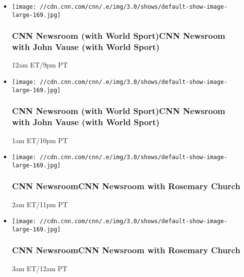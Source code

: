 \begin{itemize}
\item
  \texttt{[image: //cdn.cnn.com/cnn/.e/img/3.0/shows/default-show-image-large-169.jpg]}

  \hypertarget{cnn-newsroom-with-world-sportcnn-newsroom-with-john-vause-with-world-sport--4}{%
  \subsubsection{CNN Newsroom (with World Sport)CNN Newsroom with John
  Vause (with World Sport)
  }\label{cnn-newsroom-with-world-sportcnn-newsroom-with-john-vause-with-world-sport--4}}

  12am ET/9pm PT
\end{itemize}

\begin{itemize}
\item
  \texttt{[image: //cdn.cnn.com/cnn/.e/img/3.0/shows/default-show-image-large-169.jpg]}

  \hypertarget{cnn-newsroom-with-world-sportcnn-newsroom-with-john-vause-with-world-sport--5}{%
  \subsubsection{CNN Newsroom (with World Sport)CNN Newsroom with John
  Vause (with World Sport)
  }\label{cnn-newsroom-with-world-sportcnn-newsroom-with-john-vause-with-world-sport--5}}

  1am ET/10pm PT
\end{itemize}

\begin{itemize}
\item
  \texttt{[image: //cdn.cnn.com/cnn/.e/img/3.0/shows/default-show-image-large-169.jpg]}

  \hypertarget{cnn-newsroomcnn-newsroom-with-rosemary-church--6}{%
  \subsubsection{CNN NewsroomCNN Newsroom with Rosemary Church
  }\label{cnn-newsroomcnn-newsroom-with-rosemary-church--6}}

  2am ET/11pm PT
\end{itemize}

\begin{itemize}
\item
  \texttt{[image: //cdn.cnn.com/cnn/.e/img/3.0/shows/default-show-image-large-169.jpg]}

  \hypertarget{cnn-newsroomcnn-newsroom-with-rosemary-church--7}{%
  \subsubsection{CNN NewsroomCNN Newsroom with Rosemary Church
  }\label{cnn-newsroomcnn-newsroom-with-rosemary-church--7}}

  3am ET/12am PT
\end{itemize}

